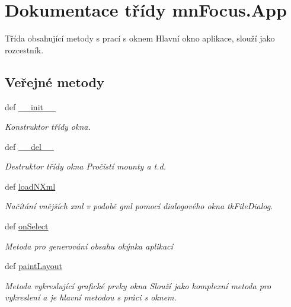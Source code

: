 \hypertarget{classmnFocus_1_1App}{\section{Dokumentace třídy mn\-Focus.\-App}
\label{db/d36/classmnFocus_1_1App}
}


Třída obsahující metody s prací s oknem Hlavní okno aplikace, slouží jako rozcestník.  


\subsection*{Veřejné metody}
\begin{DoxyCompactItemize}
\item 
def \hyperlink{classmnFocus_1_1App_a97bc8ac328112964677c50ac80a0eee5}{\-\_\-\-\_\-init\-\_\-\-\_\-}
\begin{DoxyCompactList}\small\item\em Konstruktor třídy okna. \end{DoxyCompactList}\item 
def \hyperlink{classmnFocus_1_1App_a3d339eb622b6ddb53468688907d11684}{\-\_\-\-\_\-del\-\_\-\-\_\-}
\begin{DoxyCompactList}\small\item\em Destruktor třídy okna Pročistí mounty a t.\-d. \end{DoxyCompactList}\item 
def \hyperlink{classmnFocus_1_1App_a6a8df6016b56a84b88025c5058069fb5}{load\-N\-Xml}
\begin{DoxyCompactList}\small\item\em Načítání vnějších xml v podobě gml pomocí dialogového okna tk\-File\-Dialog. \end{DoxyCompactList}\item 
def \hyperlink{classmnFocus_1_1App_a3dded74c82de81f3918cc0ea2bd1cd69}{on\-Select}
\begin{DoxyCompactList}\small\item\em Metoda pro generování obsahu okýnka aplikací \end{DoxyCompactList}\item 
def \hyperlink{classmnFocus_1_1App_a600fc232b0400302e1f235e1e1b463f7}{paint\-Layout}
\begin{DoxyCompactList}\small\item\em Metoda vykreslující grafické prvky okna Slouží jako komplexní metoda pro vykreslení a je hlavní metodou s práci s oknem. \end{DoxyCompactList}\item 

\end{DoxyCompactItemize}

